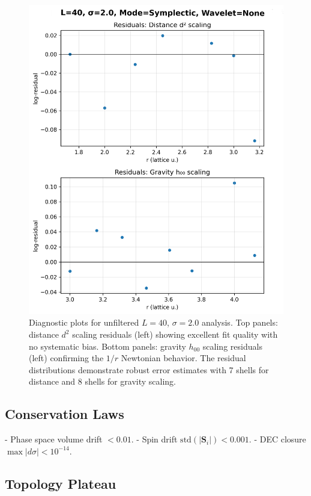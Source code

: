 \documentclass[prd,twocolumn,showpacs,superscriptaddress]{revtex4-2}
\begin{document}
	\begin{figure}[ht]
		\centering
		\includegraphics[width=0.9\columnwidth]{egravity_diagnostics_L40_sigma2.0_20250729_133403.png}
		\caption{Diagnostic plots for unfiltered $L=40$, $\sigma=2.0$ analysis. Top panels: distance $d^2$ scaling residuals (left) showing excellent fit quality with no systematic bias. Bottom panels: gravity $h_{00}$ scaling residuals (left) confirming the $1/r$ Newtonian behavior. The residual distributions demonstrate robust error estimates with 7 shells for distance and 8 shells for gravity scaling.}
		\label{fig:diagnostics}
	\end{figure}
	
	\subsection{Conservation Laws}
	
	- Phase space volume drift \(< 0.01\).
	- Spin drift \(\mathrm{std}(|\bm{S}_i|) < 0.001\).
	- DEC closure \(\max |d\sigma| < 10^{-14}\).
	
	\subsection{Topology Plateau}
	
\end{document}
